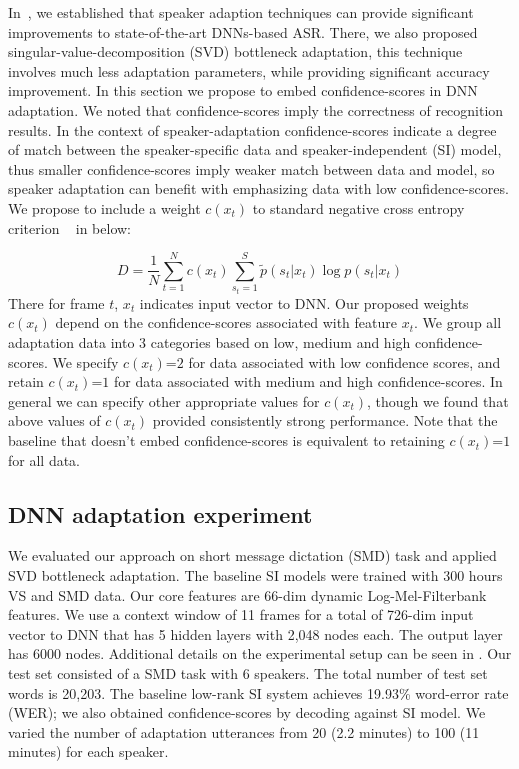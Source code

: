 In~\cite{XueSVDAdaptation}, we established that speaker adaption techniques can provide significant improvements to state-of-the-art DNNs-based ASR. There, we also proposed singular-value-decomposition (SVD) bottleneck adaptation, this technique involves much less adaptation parameters, while providing significant accuracy improvement.
In this section we propose to embed confidence-scores in DNN adaptation. We noted that confidence-scores imply the correctness of recognition results. In the context of speaker-adaptation confidence-scores indicate a degree of match between the speaker-specific data and speaker-independent (SI) model, thus smaller confidence-scores imply weaker match between data and model, so speaker adaptation can benefit with emphasizing data with low confidence-scores. We propose to include a weight $c(x_t)$ to standard negative cross entropy criterion ~\cite{rumelhart1988learning} in below:

\begin{equation}
D = \frac{1}{N} \sum_{t=1}^{N}c(x_t)\sum_{s_t=1}^{S} \tilde{p}(s_t|x_t) \log p(s_t|x_t)
\end{equation}
There for frame $t$, $x_t$ indicates input vector to DNN. Our proposed weights $c(x_t)$ depend on the confidence-scores associated with feature $x_t$. We group all adaptation data into 3 categories based on low, medium and high confidence-scores. We specify $c(x_t)$=$2$ for data associated with low confidence scores, and retain $c(x_t)$=$1$ for data associated with medium and high confidence-scores. In general we can specify other appropriate values for $c(x_t)$, though we found that above values of $c(x_t)$ provided consistently strong performance. Note that the baseline that doesn't embed confidence-scores is equivalent to retaining $c(x_t)$=$1$ for all data.

\subsection{DNN adaptation experiment}
We evaluated our approach on short message dictation (SMD) task and applied SVD bottleneck adaptation. The baseline SI models were trained with 300 hours VS and SMD data. Our core features are 66-dim dynamic Log-Mel-Filterbank features. We use a context window of 11 frames for a total of 726-dim input vector to DNN that has 5 hidden layers with 2,048 nodes each. The output layer has 6000 nodes. Additional details on the experimental setup can be seen in \cite{XueSVDAdaptation}. Our test set consisted of a SMD task with 6 speakers. The total number of test set words is 20,203. The baseline low-rank SI system achieves 19.93\% word-error rate (WER); we also obtained confidence-scores by decoding against SI model. We varied the number of adaptation utterances from 20 (2.2 minutes) to 100 (11 minutes) for each speaker. 


